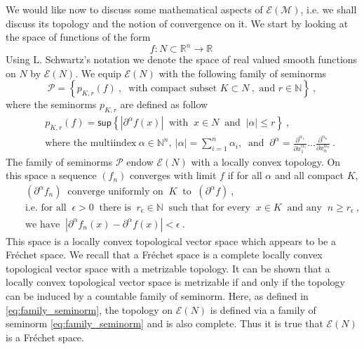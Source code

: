 \documentclass[11pt]{book}
\renewcommand{\sup}{\mathsf{sup}}
\newcommand{\abs}[1]{\left|#1\right|}
\newcommand{\Ecal}{\mathcal{E}}
\newcommand{\Mcal}{\mathcal{M}}
\newcommand{\Pcal}{\mathcal{P}}
\newcommand{\Nbb}{\mathbb{N}}
\newcommand{\Rbb}{\mathbb{R}}
\theoremstyle{break}
\begin{document}
We would like now to discuss some mathematical aspects of $\Ecal(\Mcal)$, i.e. we shall discuss its topology and the notion of convergence on it. We start by looking at the space of functions of the form
%
\begin{equation*}
f : N \subset \Rbb^n \to \Rbb \ 
\end{equation*}
%
Using L. Schwartz's notation we denote the space of real valued smooth functions on $N$ by $\Ecal(N)$. We equip $\Ecal(N)$ with the following family of seminorms
%
\begin{equation}
\Pcal = \left\{ p_{K,r}(f) \ , \ \mbox{ with compact subset } K \subset N \ , \mbox{ and } r \in \Nbb \right\} \ ,
\label{eq:family_seminorm}
\end{equation}
%
where the seminorms $p_{K,r}$ are defined as follow
%
\begin{eqnarray}
&& p_{K,r}(f) = \sup \left\{ \abs{\partial^\alpha f(x)} \ \mbox{ with } \ x \in N \ \mbox{ and } \ \abs{\alpha} \leq r  \right\} \ , \nonumber \\
&& \mbox{where the multiindex} \ \alpha \in \Nbb^n, \ \abs{\alpha} = \sum_{i=1}^n \alpha_i, \ \mbox{ and } \ \partial^\alpha = \frac{\partial^{\alpha_1}}{\partial x_1^{\alpha_1}} \dots \frac{\partial^{\alpha_n}}{\partial x_n^{\alpha_n}} \ .
\label{eq:conv_multiindex}
\end{eqnarray}
%
The family of seminorms $\Pcal$ endow $\Ecal(N)$ with a locally convex topology. On this space a sequence $(f_n)$ converges with limit $f$ if for all $\alpha$ and all compact $K$,
%
\begin{eqnarray*}
&& (\partial^\alpha f_n) \ \mbox{ converge uniformly on } \ K \ \mbox{ to } \ (\partial^\alpha f) \ , \\
&& \mbox{i.e. for all } \ \epsilon > 0 \ \mbox{ there is } \ r_\epsilon \in \Nbb \ \mbox{ such that for every } \  x \in K \ \mbox{ and any } \ n \geq r_\epsilon \ , \\
&& \mbox{we have } \ \abs{\partial^\alpha f_n(x) - \partial^\alpha f(x)} < \epsilon \ . 
\end{eqnarray*}
%
This space is a locally convex topological vector space which appears to be a Fréchet space. We recall that a Fréchet space is a complete locally convex topological vector space with a metrizable topology. It can be shown that a locally convex topological vector space is metrizable if and only if the topology can be induced by a countable family of seminorm. Here, as defined in \eqref{eq:family_seminorm}, the topology on $\Ecal(N)$ is defined via a family of seminorm \eqref{eq:family_seminorm} and is also complete. Thus it is true that $\Ecal(N)$ is a Fréchet space.
\end{document}
